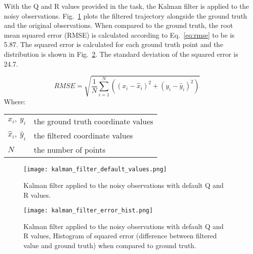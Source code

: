 \documentclass{report}
\makeatletter
\newenvironment{conditions}
  {\par\vspace{\abovedisplayskip}\noindent\begin{tabular}{>{$}l<{$} @{${}={}$} l}}
  {\end{tabular}\par\vspace{\belowdisplayskip}}
\makeatother
\begin{document}
With the Q and R values provided in the task, the Kalman filter is applied to the noisy observations. Fig.~\ref{fig:kalman_filter_default_values} plots the filtered trajectory alongside the ground truth and the original observations. When compared to the ground truth, the root mean squared error (RMSE) is calculated according to Eq.~\ref{eq:rmse} to be is 5.87. The squared error is calculated for each ground truth point and the distribution is shown in Fig.~\ref{fig:kalman_filter_error_hist}. The standard deviation of the squared error is 24.7.

\begin{equation}
    RMSE = \sqrt{\frac{1}{N} \sum_{i=1}^{N} ((x_{i} - \hat{x}_{i})^2 + (y_{i} - \hat{y}_{i})^2)}
    \label{eq:rmse}
\end{equation}
Where:
\begin{conditions}
 x_{i},\ y_{i}             & the ground truth coordinate values \\
 \hat{x}_{i},\ \hat{y}_{i} & the filtered coordinate values \\
 N                         & the number of points
\end{conditions}

\begin{figure}[ht]
    \centering
    \texttt{[image: kalman\_filter\_default\_values.png]}
    \caption{Kalman filter applied to the noisy observations with default Q and R values.}
    \label{fig:kalman_filter_default_values}
\end{figure}

\begin{figure}[ht]
    \centering
    \texttt{[image: kalman\_filter\_error\_hist.png]}
    \caption{Kalman filter applied to the noisy observations with default Q and R values, Histogram of squared error (difference between filtered value and ground truth) when compared to ground truth.}
    \label{fig:kalman_filter_error_hist}
\end{figure}
\end{document}
